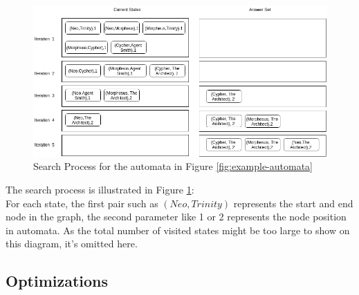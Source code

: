 \begin{figure}[h!]
  \caption{Search Process for the automata in Figure \ref{fig:example-automata} }
  \label{fig:example-query-process}
  \centering
    \includegraphics[width=1.0\textwidth]{img/Example-query-process}
\end{figure}
The search process is illustrated in Figure \ref{fig:example-query-process}:\\
For each state, the first pair such as $(Neo,Trinity)$ represents the start and end node in the graph, the second parameter like 1 or 2 represents the node position in automata. As the total number of visited states might be too large to show on this diagram, it's omitted here.
\subsection{Optimizations}
